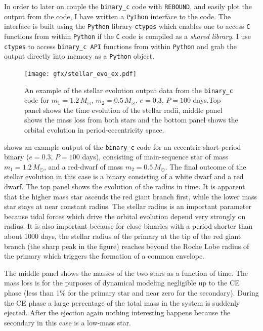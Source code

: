 \documentclass[ twoside,openright,titlepage,numbers=noenddot,headinclude,%
                footinclude=true,cleardoublepage=empty,abstractoff, %
                BCOR=5mm,paper=a4,fontsize=11pt,%
                american,%
                ]{scrreprt}
\begin{document}
In order to later on couple the \texttt{binary\_c} code with \texttt{REBOUND},
and easily plot the output from the code, I have written a \texttt{Python}
interface to the code. The interface is built using the \texttt{Python} 
library \texttt{ctypes} which enables one to access \texttt{C} functions
from within \texttt{Python} if the \texttt{C} code is compiled as a \emph{
    shared library}. I use \texttt{ctypes} to access \texttt{binary\_c API}
functions from within \texttt{Python} and grab the output directly into memory
as a \texttt{Python} object.
\begin{figure}[htb]
\centering
\texttt{[image: gfx/stellar\_evo\_ex.pdf]}
\caption{An example of the stellar evolution output data from the \texttt{binary\_c}
    code for $m_1=1.2\,M_\odot$, $m_2=0.5\,M_\odot$, $e=0.3$, $P=100$ days.Top 
    panel shows the time evolution of the stellar radii, middle panel shows
    the mass loss from both stars and the bottom panel shows the 
    orbital evolution in period-eccentricity space.}
\label{fig:stellar_evo_ex}
\end{figure}

 shows an example output of the \texttt{binary\_c} code
for an eccentric short-period binary ($e=0.3$, $P=100$ days), consisting of 
main-sequence star of mass  
$m_1=1.2\,M_\odot$, and a red-dwarf of mass $m_2=0.5\,M_\odot$. 
The final outcome of the stellar evolution in this case is a binary 
consisting of a white dwarf and a red dwarf.
The top panel shows the evolution of the radius in time. It is apparent that 
the higher mass star ascends the red giant branch first, while the lower mass
star stays at near constant radius. The stellar radius is an important parameter
because tidal forces which drive the orbital evolution depend very strongly on 
radius. It is also important because for close binaries with a period shorter
than about 1000 days, the stellar radius of the primary at the tip of the 
red giant branch (the sharp peak in the figure) reaches beyond the Roche
Lobe radius of the primary which triggers the formation of a common envelope. 

The middle panel shows the masses of the two stars as a function of time.
The mass loss is for the purposes of dynamical modeling negligible up to 
the CE phase (less than 1\% for the primary star and near zero for the 
secondary). During the CE phase a large percentage of the total mass in 
the system is suddenly ejected. After the ejection again nothing interesting
happens because the secondary in this case is a low-mass star.
\end{document}
